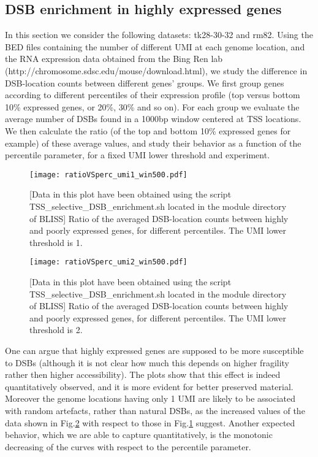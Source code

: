 \documentclass[11pt,a4paper]{article}
\begin{document}
\subsection{DSB enrichment in highly expressed genes}
In this section we consider the following datasets: tk28-30-32 and rm82. Using the BED files containing the number of different UMI at each genome location, and the RNA expression data obtained from the Bing Ren lab (http://chromosome.sdsc.edu/mouse/download.html), we study the difference in 
DSB-location counts between different genes' groups. We first group genes according to 
different percentiles of their expression profile (top versus bottom 10\% expressed genes, or 20\%, 30\% and so on). For each group we evaluate the average number of DSBs found in a 1000bp window centered at TSS locations. We then calculate the ratio (of the top and bottom 10\% expressed genes for example) of these average values, and study their behavior as a function of 
the percentile parameter, for a fixed UMI lower threshold and experiment. 
\begin{figure}[hbtp]
\centering
\texttt{[image: ratioVSperc\_umi1\_win500.pdf]}
\caption{[Data in this plot have been obtained using the script TSS{\_}selective{\_}DSB{\_}enrichment.sh
located in the module directory of BLISS]
Ratio of the averaged DSB-location counts between highly and poorly expressed genes, for different percentiles. The UMI lower threshold is 1.}
\label{fig:topvsbot1}
\end{figure}
\begin{figure}[hbtp]
\centering
\texttt{[image: ratioVSperc\_umi2\_win500.pdf]}
\caption{[Data in this plot have been obtained using the script TSS{\_}selective{\_}DSB{\_}enrichment.sh
located in the module directory of BLISS]
Ratio of the averaged DSB-location counts between highly and poorly expressed genes, for different percentiles. The UMI lower threshold is 2.}
\label{fig:topvsbot2}
\end{figure}
One can argue that highly expressed genes are supposed to be more susceptible 
to DSBs (although it is not clear how much this depends on higher fragility rather then higher accessibility). The plots show that this effect is indeed quantitatively observed, and it is more evident for better preserved material. Moreover the genome locations having only 1 UMI are likely to be associated with random artefacts, rather than natural DSBs, as the increased values of the data shown in Fig.\ref{fig:topvsbot2} with respect to those in Fig.\ref{fig:topvsbot1} suggest. Another expected behavior, which we are able to capture quantitatively, is the monotonic decreasing of the curves with respect to the percentile parameter.
\end{document}

